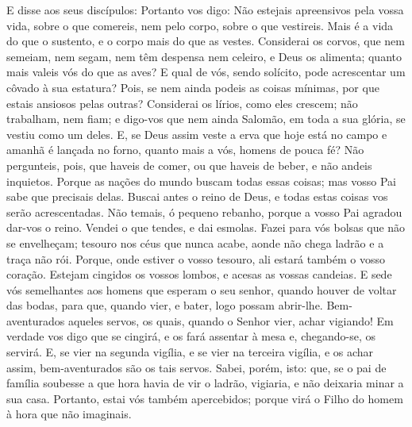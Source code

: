 E disse aos seus discípulos: Portanto vos digo: Não estejais
apreensivos pela vossa vida, sobre o que comereis, nem pelo corpo,
sobre o que vestireis. Mais é a vida do que o sustento, e o
corpo mais do que as vestes. Considerai os corvos, que nem
semeiam, nem segam, nem têm despensa nem celeiro, e Deus os
alimenta; quanto mais valeis vós do que as aves? E qual de
vós, sendo solícito, pode acrescentar um côvado à sua estatura?
Pois, se nem ainda podeis as coisas mínimas, por que estais
ansiosos pelas outras? Considerai os lírios, como eles
crescem; não trabalham, nem fiam; e digo-vos que nem ainda Salomão,
em toda a sua glória, se vestiu como um deles. E, se Deus
assim veste a erva que hoje está no campo e amanhã é lançada no
forno, quanto mais a vós, homens de pouca fé? Não pergunteis,
pois, que haveis de comer, ou que haveis de beber, e não andeis
inquietos. Porque as nações do mundo buscam todas essas
coisas; mas vosso Pai sabe que precisais delas. Buscai antes
o reino de Deus, e todas estas coisas vos serão acrescentadas.
Não temais, ó pequeno rebanho, porque a vosso Pai agradou
dar-vos o reino. Vendei o que tendes, e dai esmolas. Fazei
para vós bolsas que não se envelheçam; tesouro nos céus que nunca
acabe, aonde não chega ladrão e a traça não rói. Porque, onde
estiver o vosso tesouro, ali estará também o vosso coração.
Estejam cingidos os vossos lombos, e acesas as vossas
candeias. E sede vós semelhantes aos homens que esperam o seu
senhor, quando houver de voltar das bodas, para que, quando vier, e
bater, logo possam abrir-lhe. Bem-aventurados aqueles servos,
os quais, quando o Senhor vier, achar vigiando! Em verdade vos digo
que se cingirá, e os fará assentar à mesa e, chegando-se, os
servirá. E, se vier na segunda vigília, e se vier na terceira
vigília, e os achar assim, bem-aventurados são os tais servos.
Sabei, porém, isto: que, se o pai de família soubesse a que
hora havia de vir o ladrão, vigiaria, e não deixaria minar a sua
casa. Portanto, estai vós também apercebidos; porque virá o
Filho do homem à hora que não imaginais.

